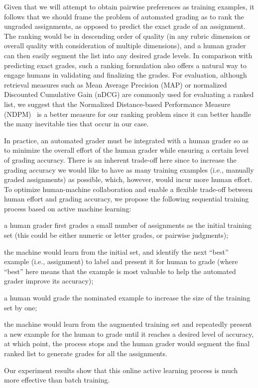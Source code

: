 Given that we will attempt to obtain pairwise preferences as training
examples, it follows that we should frame the problem of automated grading
as to rank the ungraded assignments, as opposed to predict the exact grade
of an assignment. The ranking would be in descending order of quality (in
any rubric dimension or overall quality with consideration of multiple
dimensions), and a human grader can  then easily segment the list into any
desired grade levels.  In comparison with predicting exact grades, such a
ranking formulation also offers a natural way to engage humans in
validating and finalizing the grades.  For evaluation, although retrieval
measures such as Mean Average Precision (MAP) or normalized Discounted
Cumulative Gain (nDCG) are commonly used for evaluating a ranked list, we
suggest that the Normalized Distance-based Performance Measure
(NDPM)~\cite{Yao:1995:JASIS} is a better measure for our ranking problem
since it can better handle the many inevitable ties that occur in our case.

In practice, an automated grader must be integrated with a human grader so
as to minimize the overall effort of the human grader while ensuring a
certain level of grading accuracy. There is an inherent trade-off here since
to increase the grading accuracy we would like to have as many training
examples (i.e., manually graded assignments) as possible, which, however,
would incur more human effort. To optimize human-machine collaboration and
enable a flexible trade-off between human effort and grading accuracy, we
propose the following sequential training process based on active machine
learning:
\begin{enumerate*}[label=\itshape(\arabic*)\upshape]
  \item a human grader first grades a small number of assignments as the
    initial training set (this could be either numeric or letter grades, or
    pairwise judgments);
  \item the machine would learn from the initial set, and identify the next
    ``best'' example (i.e., assignment) to label and present it for human
    to grade (where ``best'' here means that the example is most valuable
    to help the automated grader improve its accuracy);
  \item a human would grade the nominated example to increase the size of
    the training set by one;
  \item the machine would learn from the augmented training set and
    repeatedly present a new example for the human to grade until it
    reaches a desired level of accuracy, at which point, the process stops
    and the human grader would segment the final ranked list to generate
    grades for all the assignments.
\end{enumerate*}
Our experiment results show that this online active learning process is much
more effective than batch training.


